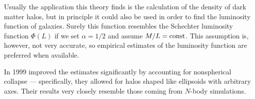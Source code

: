 \documentclass[main.tex]{subfiles}
\begin{document}
Usually the application this theory finds is the calculation of the density of dark matter halos, but in principle it could also be used in order to find the luminosity function of galaxies. Surely this function resembles the Schechter luminosity function \(\Phi (L)\) if we set \(\alpha = 1/2\) and assume \(M / L = \text{const}\). 
This assumption is, however, not very accurate, so empirical estimates of the luminosity function are preferred when available. 

In 1999 \textcite[]{shethEllipsoidalCollapseImproved2001} improved the estimates significantly by accounting for nonspherical collapse --- specifically, they allowed for halos shaped like ellipsoids with arbitrary axes.
Their results very closely resemble those coming from \(N\)-body simulations.
\end{document}
